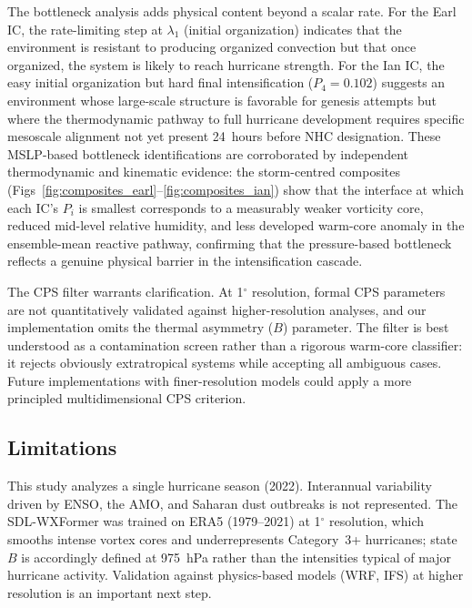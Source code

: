 \documentclass[11pt]{article}
\begin{document}
The bottleneck analysis adds physical content beyond a scalar rate. For the Earl IC,
the rate-limiting step at $\lambda_1$ (initial organization) indicates that the
environment is resistant to producing organized convection but that once organized,
the system is likely to reach hurricane strength. For the Ian IC, the
easy initial organization but hard final intensification ($P_4 = 0.102$) suggests
an environment whose large-scale structure is favorable for genesis attempts but
where the thermodynamic pathway to full hurricane development requires specific
mesoscale alignment not yet present 24~hours before NHC designation.
These MSLP-based bottleneck identifications are corroborated by independent
thermodynamic and kinematic evidence: the storm-centred composites
(Figs~\ref{fig:composites_earl}--\ref{fig:composites_ian}) show that the interface
at which each IC's $P_i$ is smallest corresponds to a measurably weaker vorticity
core, reduced mid-level relative humidity, and less developed warm-core anomaly in
the ensemble-mean reactive pathway, confirming that the pressure-based bottleneck
reflects a genuine physical barrier in the intensification cascade.

The CPS filter warrants clarification. At 1$^\circ$ resolution, formal CPS parameters
are not quantitatively validated against higher-resolution analyses, and our implementation
omits the thermal asymmetry ($B$) parameter. The filter is best understood as a
contamination screen rather than a rigorous warm-core classifier: it rejects obviously
extratropical systems while accepting all ambiguous cases. Future implementations with
finer-resolution models could apply a more principled multidimensional CPS criterion.

\subsection{Limitations}

This study analyzes a single hurricane season (2022). Interannual variability driven
by ENSO, the AMO, and Saharan dust outbreaks is not represented. The SDL-WXFormer was
trained on ERA5 (1979--2021) at 1$^\circ$ resolution, which smooths intense vortex
cores and underrepresents Category~3+ hurricanes; state~$B$ is accordingly defined at
975~hPa rather than the intensities typical of major hurricane activity. Validation
against physics-based models (WRF, IFS) at higher resolution is an important next step.
\end{document}
